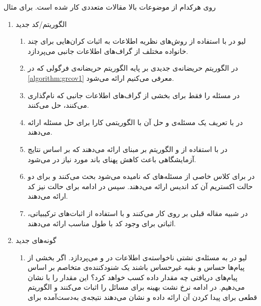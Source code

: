  روی هرکدام از موضوعات بالا مقالات متعددی کار شده است. برای مثال
 \begin{enumerate}
 	\item الگوریتم‌/کد جدید
 	\begin{enumerate}
 		\item 
 		لیو در
 		\cite{8278015}
 		با استفاده از روش‌های نظریه اطلاعات به اثبات کران‌هایی برای چند خانواده مختلف از گراف‌های اطلاعات جانبی می‌پردازد.
 		\item 
 		در
 		\cite{10313405}
 		الگوریتم حریضانه‌ی جدیدی بر پایه الگوریتم حریضانه‌ی فرگولی که در
   \autoref{algorithm:grcov1}
   معرفی می‌کنیم ارائه می‌شود.
 		\item
 		در
 		\cite{8871209}
 		مسئله را فقط برای بخشی از گراف‌های اطلاعات جانبی که
 		نام‌گذاری می‌کنند، حل می‌کنند.
 		\item
 		در
 		\cite{9759449}
 		با تعریف یک مسئله‌ی
 		و حل آن با 
 		الگوریتمی کارا برای حل مسئله ارائه می‌دهند.
 		\item
 		در
 		\cite{8682270}
 		با استفاده از
 		\picod
 		و الگوریتم بر مبنای
 		ارائه می‌دهند که بر اساس نتایج آزمایشگاهی باعث کاهش پهنای باند مورد نیاز در
 		می‌شود.
 		\item
 		در
 		\cite{sasi2019pliable}
 		برای کلاس خاصی از مسئله‌‌های
 		\picod
 		که
 		نامیده می‌شود بحث می‌کنند و برای دو حالت اکستریم آن کد اندیس ارائه می‌دهند. سپس در ادامه برای حالت
 		نیز کد ارائه می‌دهند.
 		\item 
 		در
 		\cite{8613483}
 		شبیه مقاله قبلی بر روی
 		کار می‌کنند و با استفاده از اثبات‌های ترکیبیاتی، اثباتی برای وجود کد با طول مناسب ارائه می‌دهند.
 	\end{enumerate}
 	\item گونه‌های جدید
 	\begin{enumerate}
 		\item
 		لیو در
 		\cite{10015670}
 		به مسئله‌ی نشتی ناخواسته‌ی اطلاعات در
 		\icod
 		و
 		\picod
 		می‌پردازد. اگر بخشی از پیام‌ها حساس و بقیه غیرحساس باشند یک شنودکننده‌ی متخاصم بر اساس پیام‌های دریافتی چه مقدار داده کسب خواهد کرد؟ این مقدار را با
 		نشان می‌دهیم. در ادامه نرخ نشت بهینه برای مسائل
 		\icod
 	را اثبات می‌کنند و الگوریتم قطعی برای پیدا کردن آن ارائه داده و نشان می‌دهند نتیجه‌ی به‌دست‌آمده برای

\end{enumerate}
\end{enumerate}
